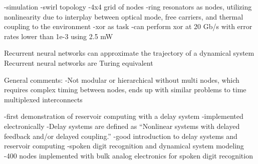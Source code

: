 \cite{desc2018}
-simulation
-swirl topology
-4x4 grid of nodes
-ring resonators as nodes, utilizing nonlinearity due to interplay between optical mode, free carriers, and thermal coupling to the environment
-xor as task
-can perform xor at 20 Gb/s with error rates lower than 1e-3 using 2.5 mW


\vspace{3em}
Recurrent neural networks can approximate the trajectory of a dynamical system \cite{funa1993}
Recurrent neural networks are Turing equivalent \cite{kisi1996}

\vspace{3em}
\cite{jaha2004}

\vspace{3em}


\vspace{3em}
\cite{vabr2017}


General comments:
-Not modular or hierarchical without multi nodes, which requires complex timing between nodes, ends up with similar problems to time multiplexed interconnects

\vspace{3em}
\cite{apso2011}
-first demonstration of reservoir computing with a delay system
-implemented electronically
-Delay systems are defined as ``Nonlinear systems with delayed feedback and/or delayed coupling.''
-good introduction to delay systems and reservoir computing
-spoken digit recognition and dynamical system modeling
-400 nodes implemented with bulk analog electronics for spoken digit recognition

